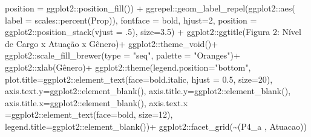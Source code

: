 \documentclass[
]{article}
\newenvironment{Shaded}{\begin{snugshade}}{\end{snugshade}}
\newcommand{\AttributeTok}[1]{\textcolor[rgb]{0.77,0.63,0.00}{#1}}
\newcommand{\DecValTok}[1]{\textcolor[rgb]{0.00,0.00,0.81}{#1}}
\newcommand{\FloatTok}[1]{\textcolor[rgb]{0.00,0.00,0.81}{#1}}
\newcommand{\FunctionTok}[1]{\textcolor[rgb]{0.00,0.00,0.00}{#1}}
\newcommand{\NormalTok}[1]{#1}
\newcommand{\SpecialCharTok}[1]{\textcolor[rgb]{0.00,0.00,0.00}{#1}}
\newcommand{\StringTok}[1]{\textcolor[rgb]{0.31,0.60,0.02}{#1}}
\begin{document}
\begin{Shaded}
\begin{Highlighting}[]
                     \AttributeTok{position =}\NormalTok{ ggplot2}\SpecialCharTok{::}\FunctionTok{position\_fill}\NormalTok{()) }\SpecialCharTok{+}
\NormalTok{  ggrepel}\SpecialCharTok{::}\FunctionTok{geom\_label\_repel}\NormalTok{(ggplot2}\SpecialCharTok{::}\FunctionTok{aes}\NormalTok{(}
    \AttributeTok{label =}\NormalTok{ scales}\SpecialCharTok{::}\FunctionTok{percent}\NormalTok{(Prop)),}
    \AttributeTok{fontface =} \StringTok{\textquotesingle{}bold\textquotesingle{}}\NormalTok{,}
    \AttributeTok{hjust=}\DecValTok{2}\NormalTok{,}
    \AttributeTok{position =}\NormalTok{ ggplot2}\SpecialCharTok{::}\FunctionTok{position\_stack}\NormalTok{(}\AttributeTok{vjust =}\NormalTok{ .}\DecValTok{5}\NormalTok{),}
    \AttributeTok{size=}\FloatTok{3.5}\NormalTok{) }\SpecialCharTok{+}
\NormalTok{  ggplot2}\SpecialCharTok{::}\FunctionTok{ggtitle}\NormalTok{(}\StringTok{\textquotesingle{}Figura 2: Nível de Cargo x Atuação x Gênero\textquotesingle{}}\NormalTok{)}\SpecialCharTok{+}
\NormalTok{  ggplot2}\SpecialCharTok{::}\FunctionTok{theme\_void}\NormalTok{()}\SpecialCharTok{+}
\NormalTok{  ggplot2}\SpecialCharTok{::}\FunctionTok{scale\_fill\_brewer}\NormalTok{(}\AttributeTok{type =} \StringTok{"seq"}\NormalTok{, }\AttributeTok{palette =} \StringTok{"Oranges"}\NormalTok{)}\SpecialCharTok{+}
\NormalTok{  ggplot2}\SpecialCharTok{::}\FunctionTok{xlab}\NormalTok{(}\StringTok{\textquotesingle{}Gênero\textquotesingle{}}\NormalTok{)}\SpecialCharTok{+}
\NormalTok{  ggplot2}\SpecialCharTok{::}\FunctionTok{theme}\NormalTok{(}\AttributeTok{legend.position=}\StringTok{"bottom"}\NormalTok{,}
                 \AttributeTok{plot.title=}\NormalTok{ggplot2}\SpecialCharTok{::}\FunctionTok{element\_text}\NormalTok{(}\AttributeTok{face=}\StringTok{\textquotesingle{}bold.italic\textquotesingle{}}\NormalTok{,}
                                                  \AttributeTok{hjust =} \FloatTok{0.5}\NormalTok{, }\AttributeTok{size=}\DecValTok{20}\NormalTok{),}
                 \AttributeTok{axis.text.y=}\NormalTok{ggplot2}\SpecialCharTok{::}\FunctionTok{element\_blank}\NormalTok{(),}
                 \AttributeTok{axis.title.y=}\NormalTok{ggplot2}\SpecialCharTok{::}\FunctionTok{element\_blank}\NormalTok{(),}
                 \AttributeTok{axis.title.x=}\NormalTok{ggplot2}\SpecialCharTok{::}\FunctionTok{element\_blank}\NormalTok{(),}
                 \AttributeTok{axis.text.x =}\NormalTok{ggplot2}\SpecialCharTok{::}\FunctionTok{element\_text}\NormalTok{(}\AttributeTok{face=}\StringTok{\textquotesingle{}bold\textquotesingle{}}\NormalTok{, }\AttributeTok{size=}\DecValTok{12}\NormalTok{),}
                 \AttributeTok{legend.title=}\NormalTok{ggplot2}\SpecialCharTok{::}\FunctionTok{element\_blank}\NormalTok{())}\SpecialCharTok{+}
\NormalTok{  ggplot2}\SpecialCharTok{::}\FunctionTok{facet\_grid}\NormalTok{(}\SpecialCharTok{\textasciitilde{}}\StringTok{\textasciigrave{}}\AttributeTok{(\textquotesingle{}P4\_a \textquotesingle{}, \textquotesingle{}Atuacao\textquotesingle{})}\StringTok{\textasciigrave{}}\NormalTok{)}
\end{Highlighting}
\end{Shaded}
\end{document}
